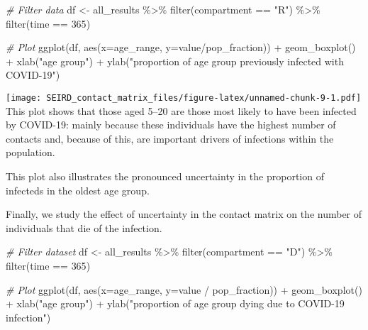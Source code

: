 \documentclass[
]{article}
\newenvironment{Shaded}{\begin{snugshade}}{\end{snugshade}}
\newcommand{\AttributeTok}[1]{\textcolor[rgb]{0.77,0.63,0.00}{#1}}
\newcommand{\CommentTok}[1]{\textcolor[rgb]{0.56,0.35,0.01}{\textit{#1}}}
\newcommand{\DecValTok}[1]{\textcolor[rgb]{0.00,0.00,0.81}{#1}}
\newcommand{\FunctionTok}[1]{\textcolor[rgb]{0.00,0.00,0.00}{#1}}
\newcommand{\NormalTok}[1]{#1}
\newcommand{\OtherTok}[1]{\textcolor[rgb]{0.56,0.35,0.01}{#1}}
\newcommand{\SpecialCharTok}[1]{\textcolor[rgb]{0.00,0.00,0.00}{#1}}
\newcommand{\StringTok}[1]{\textcolor[rgb]{0.31,0.60,0.02}{#1}}
\begin{document}
\begin{Shaded}
\begin{Highlighting}[]
\CommentTok{\# Filter data}
\NormalTok{df }\OtherTok{\textless{}{-}}\NormalTok{ all\_results }\SpecialCharTok{\%\textgreater{}\%}
  \FunctionTok{filter}\NormalTok{(compartment }\SpecialCharTok{==} \StringTok{"R"}\NormalTok{) }\SpecialCharTok{\%\textgreater{}\%} 
  \FunctionTok{filter}\NormalTok{(time }\SpecialCharTok{==} \DecValTok{365}\NormalTok{)}

\CommentTok{\# Plot}
\FunctionTok{ggplot}\NormalTok{(df,}
       \FunctionTok{aes}\NormalTok{(}\AttributeTok{x=}\NormalTok{age\_range, }\AttributeTok{y=}\NormalTok{value}\SpecialCharTok{/}\NormalTok{pop\_fraction)) }\SpecialCharTok{+}
  \FunctionTok{geom\_boxplot}\NormalTok{() }\SpecialCharTok{+}
  \FunctionTok{xlab}\NormalTok{(}\StringTok{"age group"}\NormalTok{) }\SpecialCharTok{+}
  \FunctionTok{ylab}\NormalTok{(}\StringTok{"proportion of age group previously infected with COVID{-}19"}\NormalTok{)}
\end{Highlighting}
\end{Shaded}

\texttt{[image: SEIRD\_contact\_matrix\_files/figure-latex/unnamed-chunk-9-1.pdf]}
This plot shows that those aged 5--20 are those most likely to have been
infected by COVID-19: mainly because these individuals have the highest
number of contacts and, because of this, are important drivers of
infections within the population.

This plot also illustrates the pronounced uncertainty in the proportion
of infecteds in the oldest age group.

Finally, we study the effect of uncertainty in the contact matrix on the
number of individuals that die of the infection.

\begin{Shaded}
\begin{Highlighting}[]
\CommentTok{\# Filter dataset}
\NormalTok{df }\OtherTok{\textless{}{-}}\NormalTok{ all\_results }\SpecialCharTok{\%\textgreater{}\%} 
  \FunctionTok{filter}\NormalTok{(compartment }\SpecialCharTok{==} \StringTok{"D"}\NormalTok{) }\SpecialCharTok{\%\textgreater{}\%} 
  \FunctionTok{filter}\NormalTok{(time }\SpecialCharTok{==} \DecValTok{365}\NormalTok{)}

\CommentTok{\# Plot}
\FunctionTok{ggplot}\NormalTok{(df, }\FunctionTok{aes}\NormalTok{(}\AttributeTok{x=}\NormalTok{age\_range, }\AttributeTok{y=}\NormalTok{value }\SpecialCharTok{/}\NormalTok{ pop\_fraction)) }\SpecialCharTok{+}
  \FunctionTok{geom\_boxplot}\NormalTok{() }\SpecialCharTok{+}
  \FunctionTok{xlab}\NormalTok{(}\StringTok{"age group"}\NormalTok{) }\SpecialCharTok{+}
  \FunctionTok{ylab}\NormalTok{(}\StringTok{"proportion of age group dying due to COVID{-}19 infection"}\NormalTok{)}
\end{Highlighting}
\end{Shaded}
\end{document}
